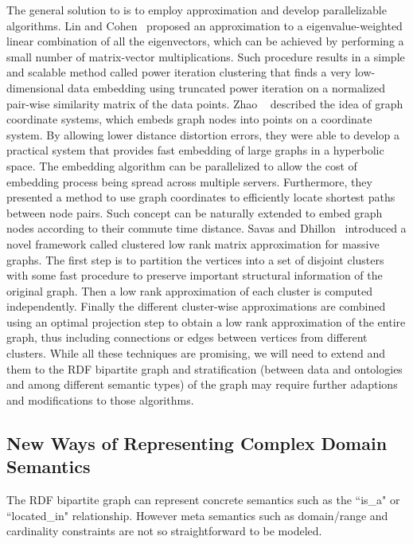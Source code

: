 The general solution to is to employ approximation and develop parallelizable algorithms. Lin and Cohen~\cite{LinEtal2010ICML} proposed an approximation to a eigenvalue-weighted linear combination of all the eigenvectors, which can be achieved by performing a small number of matrix-vector multiplications.  Such procedure results in a simple and scalable method called power iteration clustering that finds a very low-dimensional data embedding using truncated power iteration on a normalized pair-wise similarity matrix of the data points. Zhao \etal~\cite{ZhaoEtal2011Eff} described the idea of graph coordinate systems, which embeds graph nodes into points on a coordinate system. By allowing lower distance distortion errors, they were able to develop a practical system that provides fast embedding of large graphs in a hyperbolic space. The embedding algorithm can be parallelized to allow the cost of embedding process being spread across multiple servers. Furthermore, they presented a method to use graph coordinates to efficiently locate shortest paths between node pairs. Such concept can be naturally extended to embed graph nodes according to their commute time distance. Savas and Dhillon~\cite{SavasEtal2011Clu} introduced a novel framework called clustered low rank matrix approximation for massive graphs. The first step is to partition the vertices into a set of disjoint clusters with some fast procedure to preserve important structural information of the original graph. Then a low rank approximation of each cluster is computed independently. Finally the different cluster-wise approximations are combined using an optimal projection step to obtain a low rank approximation of the entire graph, thus including connections or edges between vertices from different clusters. While all these techniques are promising, we will need to extend and them to the RDF bipartite graph and stratification (between data and ontologies and among different semantic types) of the graph may require further adaptions and modifications to those algorithms.

\subsection{New Ways of Representing Complex Domain Semantics}
The RDF bipartite graph can represent concrete semantics such as the ``is\_a" or ``located_in" relationship. However meta semantics such as domain/range and cardinality constraints are not so straightforward to be modeled. 

